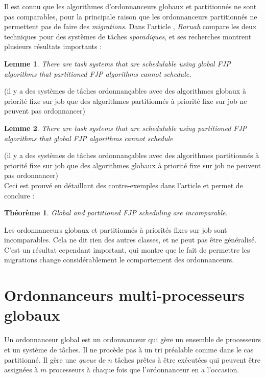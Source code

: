 \documentclass[11pt,a4paper,oneside]{report}
\newtheorem{mytheorem}{Théorème}
\newtheorem{mylemme}{Lemme}
\begin{document}
Il est connu que les algorithmes d'ordonnanceurs globaux et partitionnés ne sont pas comparables, 
pour la principale raison que les ordonnanceurs partitionnés ne permettent pas de faire des 
\textit{migrations}. Dans l'article \cite{baruah_techniques_2007}, \textit{Baruah} 
compare les deux techniques pour des systèmes de tâches \textit{sporadiques}, et 
ses recherches montrent plusieurs résultats importants :\\
\begin{mylemme}
	There are task systems that are schedulable using global FJP algorithms that partitioned FJP algorithms cannot schedule.
\end{mylemme}
(il y a des systèmes de tâches ordonnançables avec des algorithmes globaux à priorité fixe 
sur job que des algorithmes partitionnés à priorité fixe sur job ne peuvent pas ordonnancer)\\

\begin{mylemme}
	There are task systems that are schedulable using partitioned FJP algorithms that global FJP algorithms cannot schedule
\end{mylemme}
(il y a des systèmes de tâches ordonnançables avec des algorithmes partitionnés à priorité fixe 
	sur job que des algorithmes globaux à priorité fixe sur job ne peuvent pas ordonnancer)\\
Ceci est prouvé en détaillant des contre-exemples dans l'article et permet de conclure :\\
\begin{mytheorem}
	Global and partitioned FJP scheduling are incomparable.
\end{mytheorem}
Les ordonnanceurs globaux et partitionnés à priorités fixes sur job sont incomparables. 
Cela ne dit rien des autres classes, et ne peut pas être généralisé. C'est 
un résultat cependant important, qui montre que le fait de permettre les migrations 
change considérablement le comportement des ordonnanceurs.

\section{Ordonnanceurs multi-processeurs globaux}
Un ordonnanceur global est un ordonnanceur qui gère un ensemble de processeurs et 
un système de tâches. Il ne procède pas à un tri préalable comme dans le cas partitionné. 
Il gère une \textit{queue} de $n$ tâches prêtes à être exécutées 
qui peuvent être assignées à $m$ processeurs à chaque fois que l'ordonnanceur en a l'occasion.\\
\end{document}
